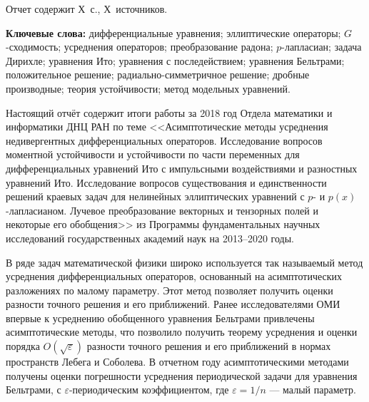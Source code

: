 \Referat %

Отчет содержит Х~с., Х~источников.%

\bigskip
\textbf{ Ключевые
	слова:}
дифференциальные уравнения;
эллиптические операторы;
$G$-сходи\-мость; %
усреднения операторов;
преобразование радона;
$p$-лапласиан;
задача Дирихле;
уравнения Ито;
уравнения с последействием;
уравнения Бельтрами;
положительное решение;
радиально-симметричное решение;
дробные производные;
теория устойчивости;
метод модельных уравнений.


\bigskip

Настоящий отчёт содержит итоги работы за 2018 год Отдела математики и информатики ДНЦ РАН по теме
<<Асимптотические методы усреднения недивергентных дифференциальных операторов. Исследование вопросов моментной устойчивости и устойчивости по части переменных для дифференциальных уравнений Ито с импульсными воздействиями и разностных уравнений Ито. Исследование вопросов существования и единственности решений краевых задач для нелинейных эллиптических уравнений с $p$- и $p(x)$-лапласианом. Лучевое преобразование векторных и тензорных полей и некоторые его обобщения>>
из Программы фундаментальных научных исследований государственных академий наук на 2013–2020 годы.



В ряде задач математической физики широко используется так называемый метод усреднения дифференциальных операторов, основанный на асимптотических разложениях по малому параметру. Этот метод позволяет получить оценки разности точного решения и его приближений.
Ранее исследователями ОМИ впервые к усреднению обобщенного уравнения Бельтрами привлечены асимптотические методы, что позволило получить теорему усреднения и оценки порядка $O(\sqrt{\varepsilon})$ разности точного решения и его приближений в нормах пространств Лебега и Соболева.
В отчетном году асимптотическими методами получены оценки погрешности усреднения периодической задачи для уравнения Бельтрами, с $\varepsilon$-периодическим коэффициентом, где $\varepsilon=1/n$  --- малый параметр.

